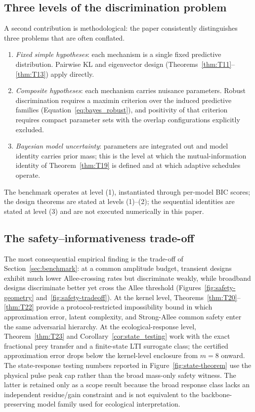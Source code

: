 \subsection{Three levels of the discrimination problem}

A second contribution is methodological: the paper consistently distinguishes three problems that are often conflated.
\begin{enumerate}
\item \emph{Fixed simple hypotheses}: each mechanism is a single fixed predictive distribution. Pairwise KL and eigenvector design (Theorems~\ref{thm:T11}--\ref{thm:T13}) apply directly.
\item \emph{Composite hypotheses}: each mechanism carries nuisance parameters. Robust discrimination requires a maximin criterion over the induced predictive families (Equation~\eqref{eq:bayes_robust}), and positivity of that criterion requires compact parameter sets with the overlap configurations explicitly excluded.
\item \emph{Bayesian model uncertainty}: parameters are integrated out and model identity carries prior mass; this is the level at which the mutual-information identity of Theorem~\ref{thm:T19} is defined and at which adaptive schedules operate.
\end{enumerate}
The benchmark operates at level (1), instantiated through per-model BIC scores; the design theorems are stated at levels (1)--(2); the sequential identities are stated at level (3) and are not executed numerically in this paper.

\subsection{The safety--informativeness trade-off}

The most consequential empirical finding is the trade-off of Section~\ref{sec:benchmark}: at a common amplitude budget, transient designs exhibit much lower Allee-crossing rates but discriminate weakly, while broadband designs discriminate better yet cross the Allee threshold (Figures~\ref{fig:safety-geometry} and~\ref{fig:safety-tradeoff}). At the kernel level, Theorems~\ref{thm:T20}--\ref{thm:T22} provide a protocol-restricted impossibility bound in which approximation error, latent complexity, and Strong-Allee common safety enter the same adversarial hierarchy. At the ecological-response level, Theorem~\ref{thm:T23} and Corollary~\ref{cor:state_testing} work with the exact fractional prey transfer and a finite-state LTI surrogate class; the certified approximation error drops below the kernel-level enclosure from $m=8$ onward. The state-response testing numbers reported in Figure~\ref{fig:state-theorem} use the physical pulse peak cap rather than the broad mass-only safety witness. The latter is retained only as a scope result because the broad response class lacks an independent residue/gain constraint and is not equivalent to the backbone-preserving model family used for ecological interpretation.

